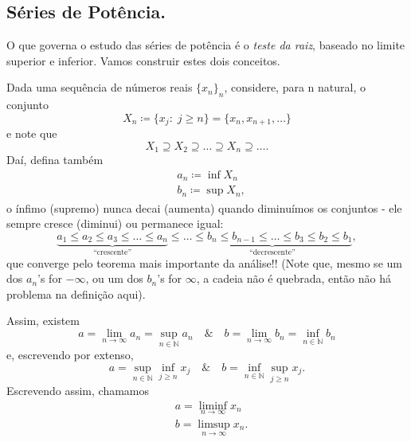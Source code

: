 \documentclass[../analysisII_notes.tex]{subfiles}
\begin{document}
\subsection{Séries de Potência.}
O que governa o estudo das séries de potência é o \textit{teste da raiz}, baseado no limite superior e inferior. Vamos construir estes dois conceitos.

Dada uma sequência de números reais \(\{x_{n}\}_{n}\), considere, para n natural, o conjunto
\[
	X_{n}\coloneqq \{x_{j}:\; j\geq n\} = \{x_{n}, x_{n+1}, \dotsc \}
\]
e note que
\[
	X_1 \supseteq X_2 \supseteq \dotsc \supseteq X_{n} \supseteq \dotsc.
\]
Daí, defina também
\begin{align*}
	 & a_{n}\coloneqq \inf_{}X_{n}  \\
	 & b_{n}\coloneqq \sup_{}X_{n},
\end{align*}
o ínfimo (supremo) nunca decai (aumenta) quando diminuímos os conjuntos - ele sempre cresce (diminui) ou permanece igual:
\[
	\underbrace{a_1 \leq a_2 \leq a_3 \leq \dotsc \leq a_{n}}_{\text{``crescente''}} \leq \dotsc \underbrace{\leq b_{n} \leq b_{n-1} \leq \dotsc \leq b_3 \leq b_2 \leq b_1}_{\text{``decrescente''}},
\]
que converge pelo teorema mais importante da análise!! (Note que, mesmo se um dos \(a_{n}\)'s for \(-\infty\), ou um dos \(b_{n}\)'s for \(\infty\), a cadeia não é quebrada, então não há problema na definição aqui).

Assim, existem
\[
	a = \lim_{n\to \infty}a_{n} = \sup_{n\in \mathbb{N}}a_{n} \quad\&\quad b = \lim_{n\to \infty}b_{n} = \inf_{n\in \mathbb{N}}b_{n}
\]
e, escrevendo por extenso,
\[
	a = \sup_{n\in \mathbb{N}}\inf_{j \geq n}x_{j} \quad\&\quad b = \inf_{n\in \mathbb{N}}\sup_{j\geq n}x_{j}.
\]
Escrevendo assim, chamamos
\begin{align*}
	 & a = \liminf_{n\to \infty}x_{n}  \\
	 & b = \limsup_{n\to \infty}x_{n}.
\end{align*}
\end{document}
